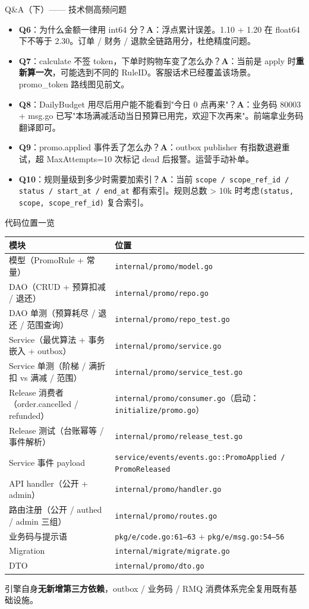 \documentclass[aspectratio=169,11pt]{beamer}
\begin{document}
\begin{frame}[shrink]{Q\&A（下）—— 技术侧高频问题}
\begin{itemize}
  \item \textbf{Q6}：为什么金额一律用 int64 分？\textbf{A}：浮点累计误差。1.10 + 1.20 在 float64 下不等于 2.30。订单 / 财务 / 退款全链路用分，杜绝精度问题。
  \item \textbf{Q7}：calculate 不签 token，下单时购物车变了怎么办？\textbf{A}：当前是 apply 时\textbf{重新算一次}，可能选到不同的 RuleID。客服话术已经覆盖该场景。promo\_token 路线图见前文。
  \item \textbf{Q8}：DailyBudget 用尽后用户能不能看到"今日 0 点再来"？\textbf{A}：业务码 80003 + msg.go 已写"本场满减活动当日预算已用完，欢迎下次再来"。前端拿业务码翻译即可。
  \item \textbf{Q9}：promo.applied 事件丢了怎么办？\textbf{A}：outbox publisher 有指数退避重试，超 MaxAttempts=10 次标记 dead 后报警。运营手动补单。
  \item \textbf{Q10}：规则量级到多少时需要加索引？\textbf{A}：当前 \texttt{scope / scope\_ref\_id / status / start\_at / end\_at} 都有索引。规则总数 > 10k 时考虑\texttt{(status, scope, scope\_ref\_id)} 复合索引。
\end{itemize}
\end{frame}

\begin{frame}[shrink]{代码位置一览}
\scriptsize
\begin{tabular}{@{}ll@{}}
\toprule
模块 & 位置 \\
\midrule
模型（PromoRule + 常量） & \texttt{internal/promo/model.go} \\
DAO（CRUD + 预算扣减 / 退还） & \texttt{internal/promo/repo.go} \\
DAO 单测（预算耗尽 / 退还 / 范围查询） & \texttt{internal/promo/repo\_test.go} \\
Service（最优算法 + 事务嵌入 + outbox） & \texttt{internal/promo/service.go} \\
Service 单测（阶梯 / 满折扣 vs 满减 / 范围） & \texttt{internal/promo/service\_test.go} \\
Release 消费者（order.cancelled / refunded） & \texttt{internal/promo/consumer.go}（启动：\texttt{initialize/promo.go}） \\
Release 测试（台账幂等 / 事件解析） & \texttt{internal/promo/release\_test.go} \\
Service 事件 payload & \texttt{service/events/events.go::PromoApplied / PromoReleased} \\
API handler（公开 + admin） & \texttt{internal/promo/handler.go} \\
路由注册（公开 / authed / admin 三组） & \texttt{internal/promo/routes.go} \\
业务码与提示语 & \texttt{pkg/e/code.go:61--63} + \texttt{pkg/e/msg.go:54--56} \\
Migration & \texttt{internal/migrate/migrate.go} \\
DTO & \texttt{internal/promo/dto.go} \\
\bottomrule
\end{tabular}
\vspace{2mm}
\small 引擎自身\textbf{无新增第三方依赖}，outbox / 业务码 / RMQ 消费体系完全复用既有基础设施。
\end{frame}
\end{document}
